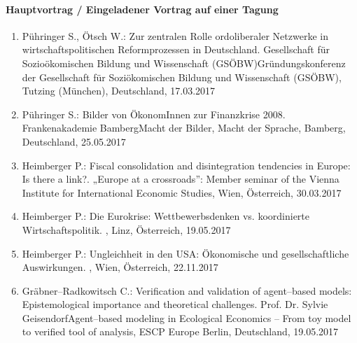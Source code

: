 \paragraph{Hauptvortrag / Eingeladener Vortrag auf einer Tagung}
\begin{enumerate}
	\item Pühringer S., Ötsch W.: Zur zentralen Rolle ordoliberaler Netzwerke in wirtschaftspolitischen Reformprozessen in Deutschland. Gesellschaft für Sozioökomischen Bildung und Wissenschaft (GSÖBW)Gründungskonferenz der Gesellschaft für Soziökomischen Bildung und Wissenschaft (GSÖBW), Tutzing (München), Deutschland, 17.03.2017
	\item Pühringer S.: Bilder von ÖkonomInnen zur Finanzkrise 2008. Frankenakademie BambergMacht der Bilder, Macht der Sprache, Bamberg, Deutschland, 25.05.2017
	\item Heimberger P.: Fiscal consolidation and disintegration tendencies in Europe: Is there a link?. „Europe at a crossroads'': Member seminar of the Vienna Institute for International Economic Studies, Wien, Österreich, 30.03.2017
	\item Heimberger P.: Die Eurokrise: Wettbewerbsdenken vs. koordinierte Wirtschaftspolitik. , Linz, Österreich, 19.05.2017
	\item Heimberger P.: Ungleichheit in den USA: Ökonomische und gesellschaftliche Auswirkungen. , Wien, Österreich, 22.11.2017
	\item Gräbner--Radkowitsch C.: Verification and validation of agent--based models: Epistemological importance and theoretical challenges. Prof. Dr. Sylvie GeisendorfAgent--based modeling in Ecological Economics -- From toy model to verified tool of analysis, ESCP Europe Berlin, Deutschland, 19.05.2017
\end{enumerate}

